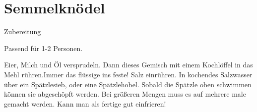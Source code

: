 \chapter*{Semmelknödel}

{\Large Zubereitung} \newline
\begin{addmargin}[1cm]{0cm}
	Passend für 1-2 Personen. \newline\newline
	
	Eier, Milch und Öl versprudeln.\newline
	Dann dieses Gemisch mit einem Kochlöffel in das Mehl rühren.\newline Immer das flüssige ins feste!\newline
	Salz einrühren.\newline
	In kochendes Salzwasser über ein Spätzlesieb, oder eine Spätzlehobel.\newline
	Sobald die Spätzle oben schwimmen können sie abgeschöpft werden.
	Bei größeren Mengen muss es auf mehrere male gemacht werden.\newline\newline
	Kann man als fertige gut einfrieren!
	
	
\end{addmargin}

